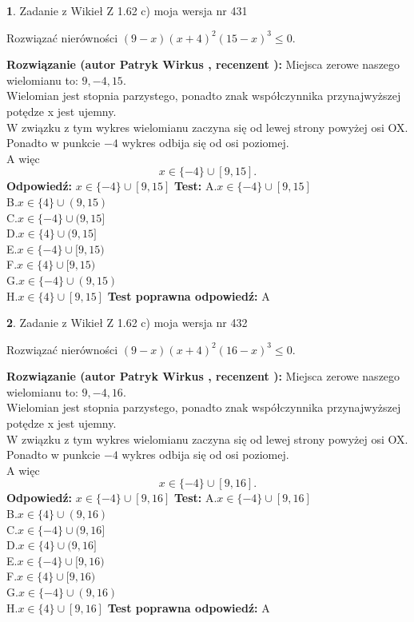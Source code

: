 \documentclass[12pt, a4paper]{article}
\theoremstyle{definition} %
\newtheorem{zad}{}
\newcommand{\zadStart}[1]{\begin{zad}#1\newline}
\newcommand{\zadStop}{\end{zad}}
\newcommand{\rozwStart}[2]{\noindent \textbf{Rozwiązanie (autor #1 , recenzent #2): }\newline}
\newcommand{\rozwStop}{\newline}
\newcommand{\odpStart}{\noindent \textbf{Odpowiedź:}\newline}
\newcommand{\odpStop}{\newline}
\newcommand{\testStart}{\noindent \textbf{Test:}\newline}
\newcommand{\testStop}{\newline}
\newcommand{\kluczStart}{\noindent \textbf{Test poprawna odpowiedź:}\newline}
\newcommand{\kluczStop}{\newline}
\begin{document}
\zadStart{Zadanie z Wikieł Z 1.62 c) moja wersja nr 431}

Rozwiązać nierówności $(9-x)(x+4)^{2}(15-x)^{3}\le0$.
\zadStop
\rozwStart{Patryk Wirkus}{}
Miejsca zerowe naszego wielomianu to: $9, -4, 15$.\\
Wielomian jest stopnia parzystego, ponadto znak współczynnika przy\linebreak najwyższej potędze x jest ujemny.\\ W związku z tym wykres wielomianu zaczyna się od lewej strony powyżej osi OX.\\
Ponadto w punkcie $-4$ wykres odbija się od osi poziomej.\\
A więc $$x \in \{-4\} \cup [9,15].$$
\rozwStop
\odpStart
$x \in \{-4\} \cup [9,15]$
\odpStop
\testStart
A.$x \in \{-4\} \cup [9,15]$\\
B.$x \in \{4\} \cup (9,15)$\\
C.$x \in \{-4\} \cup (9,15]$\\
D.$x \in \{4\} \cup (9,15]$\\
E.$x \in \{-4\} \cup [9,15)$\\
F.$x \in \{4\} \cup [9,15)$\\
G.$x \in \{-4\} \cup (9,15)$\\
H.$x \in \{4\} \cup [9,15]$
\testStop
\kluczStart
A
\kluczStop



\zadStart{Zadanie z Wikieł Z 1.62 c) moja wersja nr 432}

Rozwiązać nierówności $(9-x)(x+4)^{2}(16-x)^{3}\le0$.
\zadStop
\rozwStart{Patryk Wirkus}{}
Miejsca zerowe naszego wielomianu to: $9, -4, 16$.\\
Wielomian jest stopnia parzystego, ponadto znak współczynnika przy\linebreak najwyższej potędze x jest ujemny.\\ W związku z tym wykres wielomianu zaczyna się od lewej strony powyżej osi OX.\\
Ponadto w punkcie $-4$ wykres odbija się od osi poziomej.\\
A więc $$x \in \{-4\} \cup [9,16].$$
\rozwStop
\odpStart
$x \in \{-4\} \cup [9,16]$
\odpStop
\testStart
A.$x \in \{-4\} \cup [9,16]$\\
B.$x \in \{4\} \cup (9,16)$\\
C.$x \in \{-4\} \cup (9,16]$\\
D.$x \in \{4\} \cup (9,16]$\\
E.$x \in \{-4\} \cup [9,16)$\\
F.$x \in \{4\} \cup [9,16)$\\
G.$x \in \{-4\} \cup (9,16)$\\
H.$x \in \{4\} \cup [9,16]$
\testStop
\kluczStart
A
\kluczStop
\end{document}
